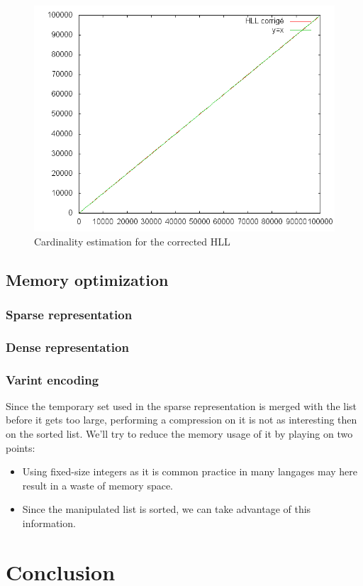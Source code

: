 \documentclass{article}
\begin{document}
\begin{center}
\begin{figure}[h]
\includegraphics[scale=0.7]{img02.png}
\caption{Cardinality estimation for the corrected HLL}
\end{figure}
\end{center}


\subsection{Memory optimization}
\subsubsection{Sparse representation}
\subsubsection{Dense representation}
\subsubsection{Varint encoding}
Since the temporary set used in the sparse representation is merged
with the list before it gets too large, performing a compression on it
is not as interesting then on the sorted list. We'll try to reduce the
memory usage of it by playing on two points:
\begin{itemize}
\item Using fixed-size integers as it is common practice in many
  langages may here result in a waste of memory space.
\item Since the manipulated list is sorted, we can take advantage of
  this information.
\end{itemize}


\section{Conclusion}
\end{document}
